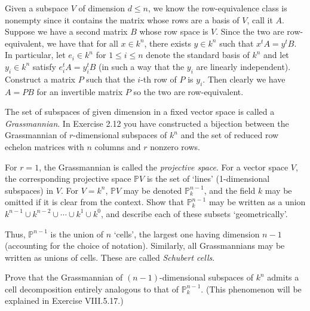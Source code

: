 \documentclass[../../master.tex]{subfiles}
\begin{document}
\begin{solution}
    Given a subspace $V$ of dimension $d \leq n$, we know the row-equivalence class is nonempty since it contains the matrix whose rows are a basis of $V$, call it $A$.
    Suppose we have a second matrix $B$ whose row space is $V$.
    Since the two are row-equivalent, we have that for all $x \in k^{n}$, there exists $y \in k^{n}$ such that $x^{t} A = y^{t} B$.
    In particular, let $e_i \in k^{n}$ for $1 \leq i \leq n$ denote the standard basis of $k^{n}$ and let $y_i \in k^{n}$ satisfy $e_i^{t} A = y_i^{t} B$ (in such a way that the $y_i$ are linearly independent).
    Construct a matrix $P$ such that the $i$-th row of $P$ is $y_i$.
    Then clearly we have $A = PB$ for an invertible matrix $P$ so the two are row-equivalent.
\end{solution}

\begin{problem}
    The set of subspaces of given dimension in a fixed vector space is called a \textit{Grassmannian}.
    In Exercise 2.12 you have constructed a bijection between the Grassmannian of $r$-dimensional subspaces of $k^{n}$ and the set of reduced row echelon matrices with $n$ columns and $r$ nonzero rows.

    For $r = 1$, the Grassmannian is called the \textit{projective space}.
    For a vector space $V$, the corresponding projective space $\mathbb{P}V$ is the set of `lines' (1-dimensional subspaces) in $V$.
    For $V = k^{n}$, $\mathbb{P}V$ may be denoted $\mathbb{P}_k^{n-1}$, and the field $k$ may be omitted if it is clear from the context.
    Show that $\mathbb{P}_k^{n-1}$ may be written as a union $k^{n-1} \cup k^{n-2} \cup \cdots \cup k^{1} \cup k^{0}$, and describe each of these subsets `geometrically'.

    Thus, $\mathbb{P}^{n-1}$ is the union of $n$ `cells', the largest one having dimension $n-1$ (accounting for the choice of notation). 
    Similarly, all Grassmannians may be written as unions of cells.
    These are called \textit{Schubert cells}.

    Prove that the Grassmannian of $(n-1)$-dimensional subspaces of $k^{n}$ admits a cell decomposition entirely analogous to that of $\mathbb{P}_k^{n-1}$.
    (This phenomenon will be explained in Exercise VIII.5.17.)
\end{problem}
\end{document}
